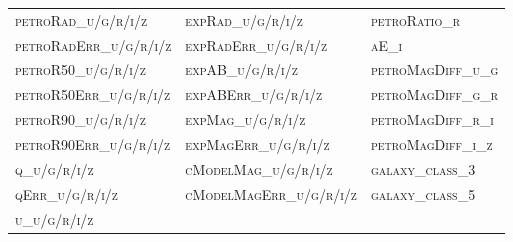 \documentclass[xcolor={table}]{beamer}
\newcommand{\featN}[1]{\textsc{#1}}
\begin{document}
\begin{frame} [plain]
\begin{scriptsize}
{\begin{tabular}{ l l l  }
\featN{petroRad\_u/g/r/i/z}	&	\featN{expRad\_u/g/r/i/z}	&	\featN{petroRatio\_r}	\\
\featN{petroRadErr\_u/g/r/i/z}	&	\featN{expRadErr\_u/g/r/i/z}	&	\featN{aE\_i}	\\
\featN{petroR50\_u/g/r/i/z}	&	\featN{expAB\_u/g/r/i/z}	&	\featN{petroMagDiff\_u\_g}	\\
\featN{petroR50Err\_u/g/r/i/z}	&	\featN{expABErr\_u/g/r/i/z}	&	\featN{petroMagDiff\_g\_r}	\\
\featN{petroR90\_u/g/r/i/z}	&	\featN{expMag\_u/g/r/i/z}	&	\featN{petroMagDiff\_r\_i}	\\
\featN{petroR90Err\_u/g/r/i/z}	&	\featN{expMagErr\_u/g/r/i/z}	&	\featN{petroMagDiff\_i\_z}	\\
\featN{q\_u/g/r/i/z}	&	\featN{cModelMag\_u/g/r/i/z}	&	\featN{galaxy\_class\_3}	\\
\featN{qErr\_u/g/r/i/z}	&	\featN{cModelMagErr\_u/g/r/i/z}	&	\featN{galaxy\_class\_5}	\\
\featN{u\_u/g/r/i/z}	&		&		\\
\hline
\end{tabular}}
\end{scriptsize}
\end{frame} 
\end{document}
